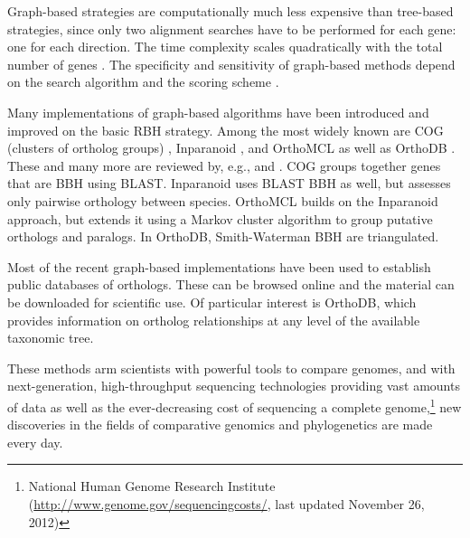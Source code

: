 

Graph-based strategies are computationally much less expensive than tree-based
strategies, since only two alignment searches have to be performed for each
gene: one for each direction. The time complexity scales
quadratically with the total number of genes \citep{altenhoff2012-1}. The
specificity and sensitivity of graph-based methods depend on the search
algorithm and the scoring scheme \citep{hulsen2006}.

Many implementations of graph-based algorithms have been introduced and improved
on the basic RBH strategy. Among the most widely known are COG (clusters of
ortholog groups) \citep{tatusov2003}, Inparanoid \citep{ostlund2010}, and
OrthoMCL \citep{li2003} as well as OrthoDB \citep{waterhouse2011}. These and
many more are reviewed by, e.g., \citet{kuzniar2008} and \citet{forslund2011}.
COG groups together genes that are BBH using BLAST. Inparanoid uses BLAST BBH as
well, but assesses only pairwise orthology between species. OrthoMCL builds on
the Inparanoid approach, but extends it using a Markov cluster algorithm to
group putative orthologs and paralogs. In OrthoDB, Smith-Waterman BBH are
triangulated.

Most of the recent graph-based implementations have been used to establish
public databases of orthologs. These can be browsed online and the material can
be downloaded for scientific use. Of particular interest is OrthoDB, which
provides information on ortholog relationships at any level of the available
taxonomic tree. 

These methods arm scientists with powerful tools to compare genomes, and with
next-generation, high-throughput sequencing technologies providing vast amounts
of data as well as the ever-decreasing cost of sequencing a complete
genome,\footnote{National Human Genome Research Institute
(\url{http://www.genome.gov/sequencingcosts/}, last updated November 26, 2012)}
new discoveries in the fields of comparative genomics and phylogenetics are made
every day. 

